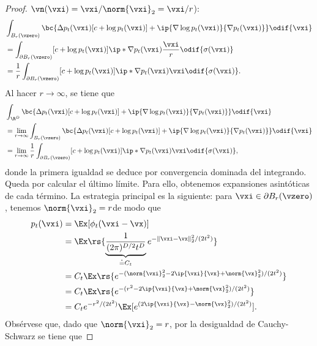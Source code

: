 \documentclass[../../book-main_es.tex]{subfiles}
\begin{document}
\begin{proof}
    \(\vn(\vxi) = \vxi/\norm{\vxi}_{2} = \vxi/r\)):
    \begin{align}
        &\int_{B_{r}(\vzero)}\bc{\Delta p_{t}(\vxi)[c + \log
            p_{t}(\vxi)] + \ip{\nabla \log p_{t}(\vxi)}{\nabla
        p_{t}(\vxi)}}\odif{\vxi} \\
        &= \int_{\partial B_{r}(\vzero)}[c + \log
        p_{t}(\vxi)]\ip*{\nabla
        p_{t}(\vxi)}{\frac{\vxi}{r}}\odif{\sigma(\vxi)} \\
        &= \frac{1}{r}\int_{\partial B_{r}(\vzero)}[c + \log
        p_{t}(\vxi)]\ip*{\nabla p_{t}(\vxi)}{\vxi}\odif{\sigma(\vxi)}.
    \end{align}
    Al hacer \(r \to \infty\), se tiene que
    \begin{align}
        &\int_{\R^{D}}\bc{\Delta p_{t}(\vxi)[c + \log p_{t}(\vxi)] +
        \ip{\nabla \log p_{t}(\vxi)}{\nabla p_{t}(\vxi)}}\odif{\vxi}
        \label{eq:app_diffusion_r_infinity_limit} \\
        &= \lim_{r \to \infty}\int_{B_{r}(\vzero)}\bc{\Delta
            p_{t}(\vxi)[c + \log p_{t}(\vxi)] + \ip{\nabla \log
        p_{t}(\vxi)}{\nabla p_{t}(\vxi)}}\odif{\vxi} \\
        &= \lim_{r \to \infty}\frac{1}{r}\int_{\partial
        B_{r}(\vzero)}[c + \log p_{t}(\vxi)]\ip*{\nabla
        p_{t}(\vxi)}{\vxi}\odif{\sigma(\vxi)},
    \end{align}
    donde la primera igualdad se deduce por convergencia dominada 
    del integrando. Queda por calcular el último límite. Para ello,
    obtenemos expansiones asintóticas de cada término. La estrategia principal es la
    siguiente: para \(\vxi \in \partial B_{r}(\vzero)\), tenemos
    \(\norm{\vxi}_{2} = r\)de modo que
    \begin{align}
        p_{t}(\vxi)
        &= \Ex[\phi_{t}(\vxi - \vx)] \\
        &= \Ex\rs{\underbrace{\frac{1}{(2\pi)^{D/2}t^{D}}}_{\doteq
        C_{t}}e^{-\|\vxi - \vx\|_{2}^{2}/(2t^{2})}} \\
        &= C_{t}\Ex\rs{e^{-(\norm{\vxi}_{2}^{2} - 2\ip{\vxi}{\vx} +
        \norm{\vx}_{2}^{2})/(2t^{2})}} \\
        &= C_{t}\Ex\rs{e^{-(r^{2} - 2\ip{\vxi}{\vx} +
        \norm{\vx}_{2}^{2})/(2t^{2})}} \\
        &= C_{t}e^{-r^{2}/(2t^{2})}\Ex[e^{(2\ip{\vxi}{\vx} -
        \norm{\vx}_{2}^{2})/(2t^{2})}].
    \end{align}
    Obsérvese que, dado que \(\norm{\vxi}_{2} = r\), por la desigualdad de Cauchy-Schwarz se tiene que

\end{proof}
\end{document}
